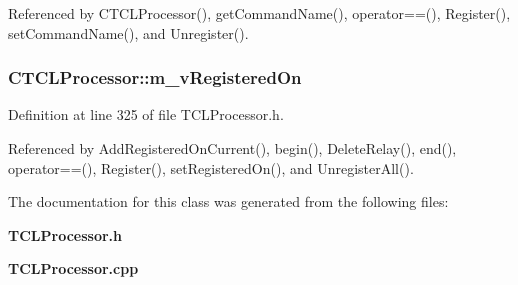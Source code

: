 Referenced by CTCLProcessor(), get\-Command\-Name(), operator==(), Register(), set\-Command\-Name(), and Unregister().
\subsubsection{ CTCLProcessor::m\_\-v\-Registered\-On\hspace{0.3cm}{\tt  [private]}}\label{classCTCLProcessor_o1}




Definition at line 325 of file TCLProcessor.h.

Referenced by Add\-Registered\-On\-Current(), begin(), Delete\-Relay(), end(), operator==(), Register(), set\-Registered\-On(), and Unregister\-All().

The documentation for this class was generated from the following files:\begin{CompactItemize}
\item 
{\bf TCLProcessor.h}\item 
{\bf TCLProcessor.cpp}\end{CompactItemize}
